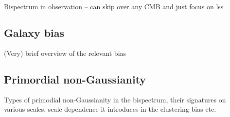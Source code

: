 Bispectrum in observation -- can skip over any CMB and just focus on lss

\subsection{Galaxy bias}

(Very) brief overview of the relevant bias


\subsection{Primordial non-Gaussianity}

Types of primodial non-Gaussianity in the bispectrum, their signatures on various scales, scale dependence it introduces in the clustering bias etc. 